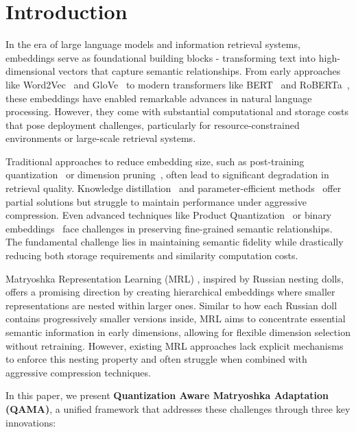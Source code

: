 \section{Introduction}

In the era of large language models and information retrieval systems, embeddings serve as foundational building blocks - transforming text into high-dimensional vectors that capture semantic relationships. From early approaches like Word2Vec~\cite{mikolov2013distributed} and GloVe~\cite{pennington2014glove} to modern transformers like BERT~\cite{devlin2019bert} and RoBERTa~\cite{liu2019roberta}, these embeddings have enabled remarkable advances in natural language processing. However, they come with substantial computational and storage costs that pose deployment challenges, particularly for resource-constrained environments or large-scale retrieval systems.

Traditional approaches to reduce embedding size, such as post-training quantization~\cite{jacob2018quantization} or dimension pruning~\cite{li2016pruning}, often lead to significant degradation in retrieval quality. 
Knowledge distillation~\cite{hinton2015distilling} and parameter-efficient methods~\cite{houlsby2019parameter} offer partial solutions but struggle to maintain performance under aggressive compression. 
Even advanced techniques like Product Quantization~\cite{jegou2010product} or binary embeddings~\cite{shen2018nash, tissier2019binarization, shu2018compressing} face challenges in preserving fine-grained semantic relationships. 
The fundamental challenge lies in maintaining semantic fidelity while drastically reducing both storage requirements and similarity computation costs.

Matryoshka Representation Learning (MRL) \cite{kusupati2021matryoshka}, inspired by Russian nesting dolls, offers a promising direction by creating hierarchical embeddings where smaller representations are nested within larger ones. Similar to how each Russian doll contains progressively smaller versions inside, MRL aims to concentrate essential semantic information in early dimensions, allowing for flexible dimension selection without retraining. However, existing MRL approaches lack explicit mechanisms to enforce this nesting property and often struggle when combined with aggressive compression techniques.

In this paper, we present \textbf{Quantization Aware Matryoshka Adaptation (QAMA)}, a unified framework that addresses these challenges through three key innovations:

